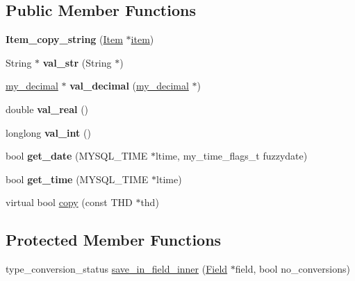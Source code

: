 \subsection*{Public Member Functions}
\begin{DoxyCompactItemize}
\item 
\mbox{\label{classItem__copy__string_ab8d8185523029af2b61fe3d2f9bd837d}} 
{\bfseries Item\+\_\+copy\+\_\+string} (\mbox{\hyperlink{classItem}{Item}} $\ast$\mbox{\hyperlink{classItem__copy_a9ef1b9fd547a3b940e89e9837083c87f}{item}})
\item 
\mbox{\label{classItem__copy__string_a137da1e25b2d96241396471d9664f960}} 
String $\ast$ {\bfseries val\+\_\+str} (String $\ast$)
\item 
\mbox{\label{classItem__copy__string_aadb3b7a51fa8a1666f0c19bb822f62d4}} 
\mbox{\hyperlink{classmy__decimal}{my\+\_\+decimal}} $\ast$ {\bfseries val\+\_\+decimal} (\mbox{\hyperlink{classmy__decimal}{my\+\_\+decimal}} $\ast$)
\item 
\mbox{\label{classItem__copy__string_a289a343de99413e4b855c0b69a4cc55f}} 
double {\bfseries val\+\_\+real} ()
\item 
\mbox{\label{classItem__copy__string_a95bb61d728d67036b552f3c54d5597e6}} 
longlong {\bfseries val\+\_\+int} ()
\item 
\mbox{\label{classItem__copy__string_ab7f12144af1e9495476ebd67d571aa37}} 
bool {\bfseries get\+\_\+date} (M\+Y\+S\+Q\+L\+\_\+\+T\+I\+ME $\ast$ltime, my\+\_\+time\+\_\+flags\+\_\+t fuzzydate)
\item 
\mbox{\label{classItem__copy__string_aa0a2834eb63ea84e938113adb9c9f52e}} 
bool {\bfseries get\+\_\+time} (M\+Y\+S\+Q\+L\+\_\+\+T\+I\+ME $\ast$ltime)
\item 
virtual bool \mbox{\hyperlink{classItem__copy__string_a35d49a3dc996343f458a63d62e7bf776}{copy}} (const T\+HD $\ast$thd)
\end{DoxyCompactItemize}
\subsection*{Protected Member Functions}
\begin{DoxyCompactItemize}
\item 
type\+\_\+conversion\+\_\+status \mbox{\hyperlink{classItem__copy__string_ab2594565cca52438e556cbce30e199e6}{save\+\_\+in\+\_\+field\+\_\+inner}} (\mbox{\hyperlink{classField}{Field}} $\ast$field, bool no\+\_\+conversions)
\end{DoxyCompactItemize}
